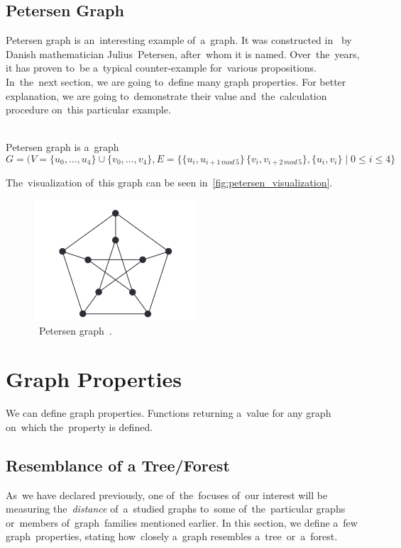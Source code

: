 \subsection{Petersen Graph}
\label{subsec:petersen}
Petersen graph is an~interesting example of~a~graph. It was constructed in~\cite{Petersen} by Danish mathematician Julius~Petersen, after~whom it is named. Over~the~years, it has proven to~be a~typical counter-example for~various propositions. In~the~next section, we are going to~define many graph properties. For better explanation, we are going to~demonstrate their value and~the~calculation procedure on~this particular example.
\\
\\
\begin{definition}
    Petersen graph is a~graph
    \[
        G = (
        V = \{u_0, \dots, u_4\} \cup \{v_0, \dots, v_4\},
        E = \{\{u_i, u_{i+1\,mod\,5}\}\, \{v_i, v_{i+2\,mod\,5}\}, \{u_i, v_i\} \mid 0 \leq i \leq 4\}
    \]
\end{definition}
The~visualization of~this graph can be seen in~\autoref{fig:petersen_visualization}.
\begin{figure}[h]
    \centering
    \includegraphics[width=0.5\linewidth]{petersen_original.png}
    \caption[Petersen graph]{~Petersen graph~\cite{Diestel}.}
    \label{fig:petersen_visualization}
\end{figure}

\section{Graph Properties}
We can define graph properties. Functions returning a~value for any graph on~which the~property is defined.

\subsection{Resemblance of a Tree/Forest}
As~we have declared previously, one of~the~focuses of~our interest will be measuring the~\textit{distance} of~a~studied graphs to~some of~the~particular graphs or~members of~graph~families mentioned earlier. In this section, we define a~few graph~properties, stating how~closely a~graph resembles a~tree~or~a~forest.

